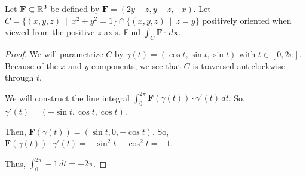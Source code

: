 \documentclass[../hw9]{subfiles}
\begin{document}
\begin{problem}[1]
Let $\textbf{F}\subset \mathbb{R}^3$ be defined by $\textbf{F}=(2y - z, y - z, -x)$.
Let $C=\{(x,y,z)\ \mid\ x^2 + y^2 = 1\}\cap \{(x,y,z)\ \mid\ z=y\}$ positively oriented when viewed from the positive $z$-axis.
Find $\int_C \textbf{F}\cdot \,d \textbf{x}$.
\end{problem}
\begin{proof}
	We will parametrize $C$ by  $\gamma(t) = (\cos{t}, \sin{t}, \sin{t})$ with $t\in [0,2\pi]$.
	Because of the $x$ and  $y$ components, we see that  $C$ is traversed anticlockwise through  $t$.

	We will construct the line integral $\int_{0}^{2\pi} \textbf{F}(\gamma(t))\cdot \gamma'(t) \,dt$.
	So, $\gamma'(t)=(-\sin{t}, \cos{t},\cos{t})$.

	Then, $\textbf{F}(\gamma(t))=(\sin{t},0,-\cos{t})$.
	So,  $\textbf{F}(\gamma(t))\cdot \gamma'(t)= -\sin^2{t}-\cos^2{t}=-1$.

	Thus, $\int_{0}^{2\pi} -1 \,dt = -2\pi$.
\end{proof}
\end{document}
